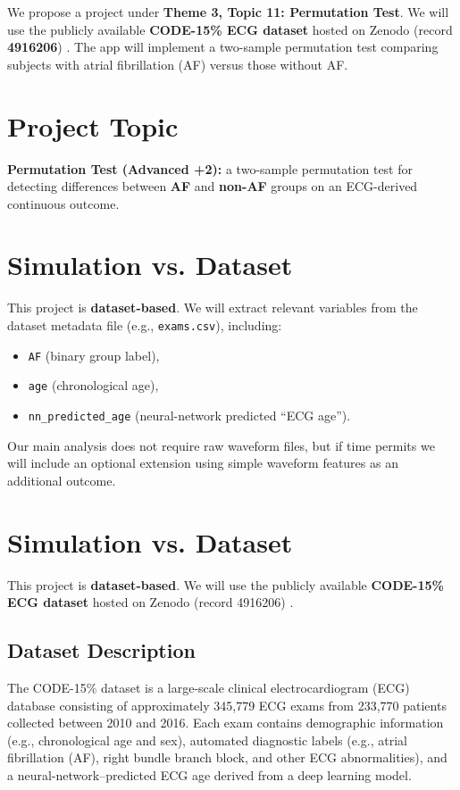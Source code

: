\documentclass{article}
\begin{document}
    \begin{normalsize}
    We propose a project under \textbf{Theme 3, Topic 11: Permutation Test}. We will use the publicly available \textbf{CODE-15\% ECG dataset} 
    hosted on Zenodo (record \textbf{4916206}) \citep{code15_zenodo_4916206}. The app will implement a two-sample permutation test comparing subjects with atrial fibrillation (AF) versus those without AF.

	\section{Project Topic}
    \textbf{Permutation Test (Advanced +2):} a two-sample permutation test for detecting differences between \textbf{AF} and \textbf{non-AF} groups on an ECG-derived continuous outcome.

	\section{Simulation vs. Dataset}
    This project is \textbf{dataset-based}. We will extract relevant variables from the dataset metadata file (e.g., \texttt{exams.csv}), including:
    \begin{itemize}
        \item \texttt{AF} (binary group label),
        \item \texttt{age} (chronological age),
        \item \texttt{nn\_predicted\_age} (neural-network predicted ``ECG age'').
    \end{itemize}
    Our main analysis does not require raw waveform files, but if time permits we will include an optional extension using simple waveform features as an additional outcome.

    \section{Simulation vs. Dataset}

    This project is \textbf{dataset-based}. We will use the publicly available
    \textbf{CODE-15\% ECG dataset} hosted on Zenodo (record 4916206) 
    \citep{code15_zenodo_4916206}.

    \subsection*{Dataset Description}

    The CODE-15\% dataset is a large-scale clinical electrocardiogram (ECG) database
    consisting of approximately 345,779 ECG exams from 233,770 patients collected
    between 2010 and 2016. Each exam contains demographic information (e.g.,
    chronological age and sex), automated diagnostic labels (e.g., atrial
    fibrillation (AF), right bundle branch block, and other ECG abnormalities),
    and a neural-network–predicted ECG age derived from a deep learning model.


\end{normalsize}
\end{document}
